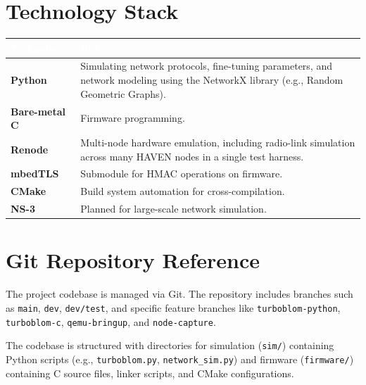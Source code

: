 \documentclass[11pt,a4paper]{article}
\newcommand{\citeref}[1]{}
\begin{document}
\section{Technology Stack}

\begin{longtable}{@{}>{\bfseries}p{3.4cm}p{10.2cm}@{}}
\toprule
\rowcolor{havennavy}
\textcolor{white}{Technology} & \textcolor{white}{Role} \\
\midrule
\endhead
Python & Simulating network protocols, fine-tuning parameters, and network modeling using the NetworkX library (e.g., Random Geometric Graphs). \\
Bare-metal C & Firmware programming. \\
Renode & Multi-node hardware emulation, including radio-link simulation across many HAVEN nodes in a single test harness. \\
mbedTLS & Submodule for HMAC operations on firmware. \\
CMake & Build system automation for cross-compilation. \\
NS-3 & Planned for large-scale network simulation. \\
\bottomrule
\end{longtable}

\section{Git Repository Reference}

The project codebase is managed via Git.\citeref{2} The repository includes branches such as \texttt{main}, \texttt{dev}, \texttt{dev/test}, and specific feature branches like \texttt{turboblom-python}, \texttt{turboblom-c}, \texttt{qemu-bringup}, and \texttt{node-capture}.\citeref{2}

The codebase is structured with directories for simulation (\texttt{sim/}) containing Python scripts (e.g., \texttt{turboblom.py}, \texttt{network\_sim.py}) and firmware (\texttt{firmware/}) containing C source files, linker scripts, and CMake configurations.\citeref{2}
\end{document}
